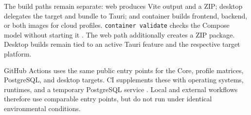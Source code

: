 The build paths remain separate: web produces Vite output and a ZIP; desktop
delegates the target and bundle to Tauri; and container builds frontend,
backend, or both images for cloud profiles. \texttt{container validate} checks
the Compose model without starting it
\parencite{kleiveist2026container,kleiveist2026release}.
The web path additionally creates a ZIP package. Desktop builds remain tied to
an active Tauri feature and the respective target platform.

GitHub Actions uses the same public entry points for the Core, profile
matrices, PostgreSQL, and desktop targets. CI supplements these with operating
systems, runtimes, and a temporary PostgreSQL service
\parencite{kleiveist2026ci}.
Local and external workflows therefore use comparable entry points, but do not
run under identical environmental conditions.
